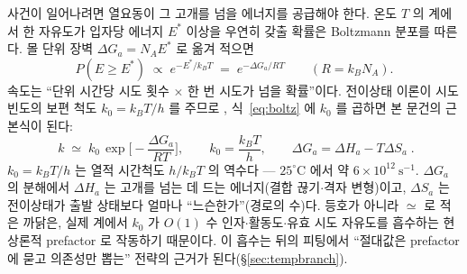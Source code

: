\documentclass[11pt,a4paper]{article}
\begin{document}
사건이 일어나려면 열요동이 그 고개를 넘을 에너지를 공급해야 한다. 온도 $T$ 의 계에서 한 자유도가
입자당 에너지 $E^*$ 이상을 우연히 갖출 확률은 Boltzmann 분포를 따른다. 몰 단위 장벽
$\Delta G_a=N_AE^*$ 로 옮겨 적으면
\begin{equation}
P(E\ge E^*)\;\propto\;e^{-E^*/k_BT}
\;=\;e^{-\Delta G_a/RT}\qquad(R=k_BN_A).
\label{eq:boltz}
\end{equation}
속도는 ``단위 시간당 시도 횟수 $\times$ 한 번 시도가 넘을 확률''이다. 전이상태 이론이 시도 빈도의
보편 척도 $k_0=k_BT/h$ 를 주므로 \cite{eyring1935}, 식~\eqref{eq:boltz} 에 $k_0$ 를 곱하면 본
문건의 근본식이 된다:
\begin{equation}
\boxed{\;k\;\simeq\;k_0\,\exp\!\Big[-\frac{\Delta G_a}{RT}\Big],\qquad
k_0=\frac{k_BT}{h},\qquad \Delta G_a=\Delta H_a-T\Delta S_a\;.}
\label{eq:eyring}
\end{equation}
$k_0=k_BT/h$ 는 열적 시간척도 $h/k_BT$ 의 역수다 — $25^\circ$C 에서 약
$6\times10^{12}\ \mathrm{s^{-1}}$.
$\Delta G_a$ 의 분해에서 $\Delta H_a$ 는 고개를 넘는 데 드는 에너지(결합 끊기$\cdot$격자 변형)이고,
$\Delta S_a$ 는 전이상태가 출발 상태보다 얼마나 ``느슨한가''(경로의 수)다. 등호가 아니라 $\simeq$ 로 적은
까닭은, 실제 계에서 $k_0$ 가 $O(1)$ 수 인자$\cdot$활동도$\cdot$유효 시도 자유도를 흡수하는 현상론적
prefactor 로 작동하기 때문이다. 이 흡수는 뒤의 피팅에서 ``절대값은 prefactor 에 묻고 의존성만 뽑는'' 전략의
근거가 된다(\S\ref{sec:tempbranch}).
\end{document}
